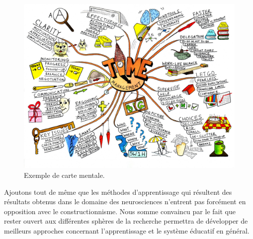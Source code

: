 \begin{figure}[H]
  \includegraphics[width=\textwidth]{../resources/illustrations/mindmap}
  \caption{Exemple de carte mentale.}
\end{figure}

Ajoutons tout de même que les méthodes d'apprentissage qui résultent des résultats obtenus dans le domaine des neurosciences n'entrent pas forcément en opposition avec le constructionnisme. Nous somme convaincu par le fait que rester ouvert aux différentes sphères de la recherche permettra de développer de meilleurs approches concernant l'apprentissage et le système éducatif en général.
